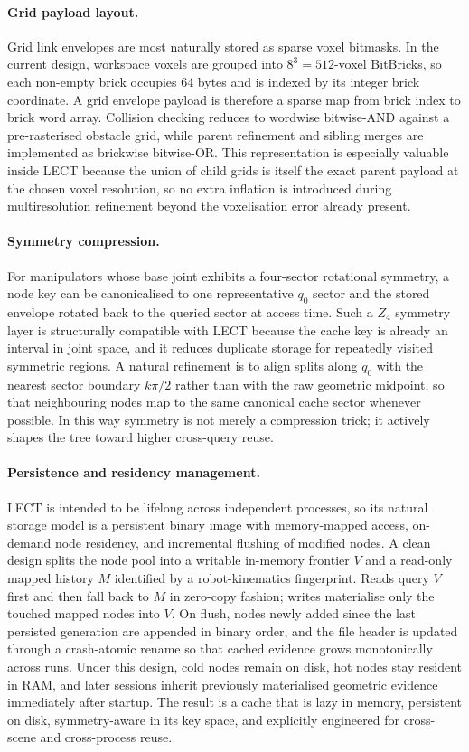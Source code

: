 \documentclass[journal]{IEEEtran}
\begin{document}
\paragraph{Grid payload layout.}
Grid link envelopes are most naturally stored as sparse voxel bitmasks. In the
current design, workspace voxels are grouped into $8^3=512$-voxel BitBricks, so
each non-empty brick occupies 64 bytes and is indexed by its integer brick
coordinate. A grid envelope payload is therefore a sparse map from brick index
to brick word array. Collision checking reduces to wordwise bitwise-AND against
a pre-rasterised obstacle grid, while parent refinement and sibling merges are
implemented as brickwise bitwise-OR. This representation is especially valuable
inside LECT because the union of child grids is itself the exact parent payload
at the chosen voxel resolution, so no extra inflation is introduced during
multiresolution refinement beyond the voxelisation error already present.

\paragraph{Symmetry compression.}
For manipulators whose base joint exhibits a four-sector rotational symmetry, a
node key can be canonicalised to one representative $q_0$ sector and the stored
envelope rotated back to the queried sector at access time. Such a $Z_4$
symmetry layer is structurally compatible with LECT because the cache key is
already an interval in joint space, and it reduces duplicate storage for
repeatedly visited symmetric regions. A natural refinement is to align splits
along $q_0$ with the nearest sector boundary $k\pi/2$ rather than with the raw
geometric midpoint, so that neighbouring nodes map to the same canonical cache
sector whenever possible. In this way symmetry is not merely a compression
trick; it actively shapes the tree toward higher cross-query reuse.

\paragraph{Persistence and residency management.}
LECT is intended to be lifelong across independent processes, so its natural
storage model is a persistent binary image with memory-mapped access,
on-demand node residency, and incremental flushing of modified nodes. A clean
design splits the node pool into a writable in-memory frontier $V$ and a
read-only mapped history $M$ identified by a robot-kinematics fingerprint.
Reads query $V$ first and then fall back to $M$ in zero-copy fashion; writes
materialise only the touched mapped nodes into $V$. On flush, nodes newly added
since the last persisted generation are appended in binary order, and the file
header is updated through a crash-atomic rename so that cached evidence grows
monotonically across runs. Under this design, cold nodes remain on disk, hot
nodes stay resident in RAM, and later sessions inherit previously materialised
geometric evidence immediately after startup. The result is a cache that is
lazy in memory, persistent on disk, symmetry-aware in its key space, and
explicitly engineered for cross-scene and cross-process reuse.
\end{document}
